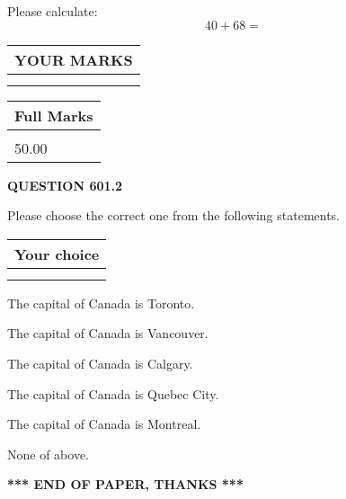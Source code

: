 \documentclass[12pt]{article}
\begin{document}
  
 
Please calculate:
\begin{equation}
40 +  %
68 = \nonumber
\end{equation}
 

 

 
  
\vspace{0.2in}
  
\noindent\begin{tabular}{|l|}
\hline
 YOUR MARKS  \\
\hline
 \\ 
 \\ 
\hline
\end{tabular}
\hspace{0.05in} \begin{tabular}{|l|}
\hline
 Full Marks  \\
\hline
 \\ 
50.00 \\
\hline
\end{tabular}
{\textbf{\Large{QUESTION
601.2 
}}}
  
  
Please choose the correct one from the following statements.
  
  
\noindent\hspace{3.0in} \begin{tabular}{|l|}
\hline
Your choice \\
\hline
 \\ 
 \\ 
\hline
\end{tabular}
  
  
 
 
The capital of Canada is Toronto.
 
 
The capital of Canada is Vancouver.
 
 
The capital of Canada is Calgary.
 
 
The capital of Canada is Quebec City.
 
 
The capital of Canada is Montreal.
 
 
 None of above.
 
 
   
   
 \vspace{0.2in}
 
   
   
   
   
\vspace{1.0in} 
{\textbf{\large{ *** END OF PAPER, THANKS *** }}} 
   
\end{document}
